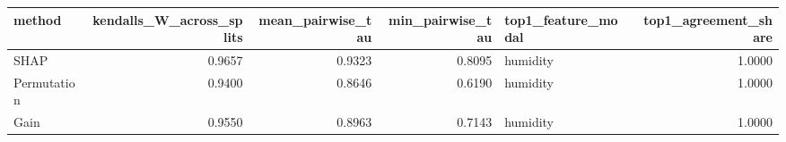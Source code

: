 \begin{tabular}{lrrrlr}
\toprule
method & kendalls_W_across_splits & mean_pairwise_tau & min_pairwise_tau & top1_feature_modal & top1_agreement_share \\
\midrule
SHAP & 0.9657 & 0.9323 & 0.8095 & humidity & 1.0000 \\
Permutation & 0.9400 & 0.8646 & 0.6190 & humidity & 1.0000 \\
Gain & 0.9550 & 0.8963 & 0.7143 & humidity & 1.0000 \\
\bottomrule
\end{tabular}
